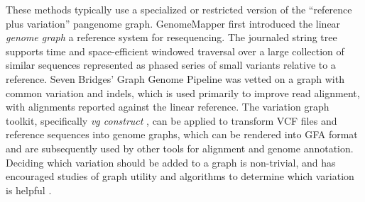 These methods typically use a specialized or restricted version of the ``reference plus variation'' pangenome graph.
GenomeMapper \cite{Schneeberger_2009} first introduced the linear \emph{genome graph} a reference system for resequencing.
The journaled string tree \cite{Rahn_2014} supports time and space-efficient windowed traversal over a large collection of similar sequences represented as phased series of small variants relative to a reference.
Seven Bridges' Graph Genome Pipeline \cite{Rakocevic_2019} was vetted on a graph with common variation and indels, which is used primarily to improve read alignment, with alignments reported against the linear reference.
The variation graph toolkit, specifically \textit{vg construct} \cite{Garrison_2018}, can be applied to transform VCF files and reference sequences into genome graphs, which can be rendered into GFA format and are subsequently used by other tools for alignment and genome annotation.
Deciding which variation should be added to a graph is non-trivial, and has encouraged studies of graph utility \cite{Novak_2017a} and algorithms to determine which variation is helpful \cite{Pritt_2018}.

